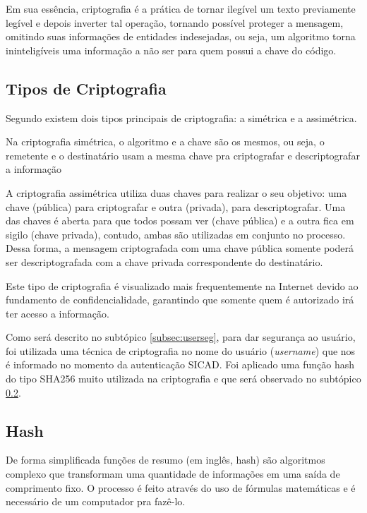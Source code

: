 \documentclass[12pt, a4paper]{report}
\begin{document}
Em sua essência, criptografia é a prática de tornar ilegível um texto previamente legível e depois inverter tal operação, tornando possível proteger a mensagem, omitindo suas informações de entidades indesejadas, ou seja, um algoritmo torna ininteligíveis uma informação a não ser para quem possui a chave do código.

\subsection{Tipos de Criptografia}

Segundo \cite{terada2008} existem dois tipos principais de criptografia: a simétrica e a assimétrica. 

Na criptografia simétrica, o algoritmo e a chave são os mesmos, ou seja, o remetente e o destinatário usam a mesma chave pra criptografar e descriptografar a informação

A criptografia assimétrica utiliza duas chaves para realizar o seu objetivo: uma chave (pública) para criptografar e outra (privada), para descriptografar. Uma das chaves é aberta para que todos possam ver (chave pública) e a outra fica em sigilo (chave privada), contudo, ambas são utilizadas em conjunto no processo. Dessa forma, a mensagem criptografada com uma chave pública somente poderá ser descriptografada com a chave privada correspondente do destinatário.

Este tipo de criptografia é visualizado mais frequentemente na Internet devido ao fundamento de confidencialidade, garantindo que somente quem é autorizado irá ter acesso a informação.

Como será descrito no subtópico \ref{subsec:userseg}, para dar segurança ao usuário, foi utilizada uma técnica de criptografia no nome do usuário (\textit{username}) que nos é informado no momento da  autenticação SICAD. Foi aplicado uma função hash do tipo SHA256 muito utilizada na criptografia e que será observado no subtópico \ref{subsec:hash}.

\subsection{Hash}
\label{subsec:hash}
De forma simplificada funções de resumo (em inglês, hash) são algoritmos complexo que transformam uma quantidade de informações em uma saída de comprimento fixo. O processo é feito através do uso de fórmulas matemáticas e é necessário de um computador pra fazê-lo.
\end{document}
